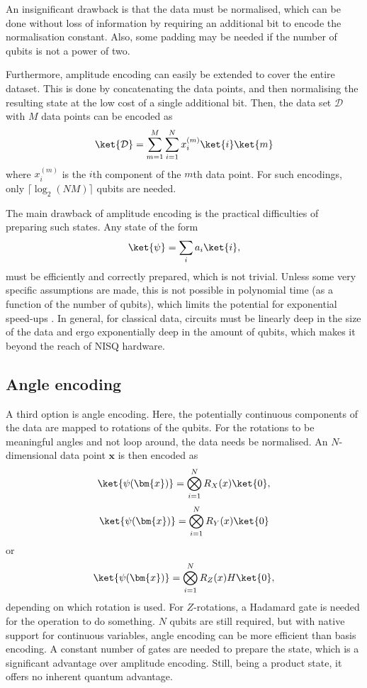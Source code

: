 An insignificant drawback is that the data must be normalised, which can be done without loss of information by requiring an additional bit to encode the normalisation constant.
Also, some padding may be needed if the number of qubits is not a power of two.

Furthermore, amplitude encoding can easily be extended to cover the entire dataset.
This is done by concatenating the data points, and then normalising the resulting state at the low cost of a single additional bit.
Then, the data set $\mathcal{D}$ with $M$ data points can be encoded as
\begin{equation}
    \ket{\mathcal{D}} = \sum_{m=1}^M \sum_{i=1}^{N} x_i^{(m)} \ket{i} \ket{m}
\end{equation}
where $x_i^{(m)}$ is the $i$th component of the $m$th data point.
For such encodings, only $\lceil \log_2 (N M) \rceil$ qubits are needed.

The main drawback of amplitude encoding is the practical difficulties of preparing such states.
Any state of the form
\begin{equation}
    \ket{\psi} = \sum_{i} a_i \ket{i},
\end{equation}
must be efficiently and correctly prepared, which is not trivial.
Unless some very specific assumptions are made, this is not possible in polynomial time (as a function of the number of qubits), which limits the potential for exponential speed-ups \cite{textbook}.
In general, for classical data, circuits must be linearly deep in the size of the data and ergo exponentially deep in the amount of qubits, which makes it beyond the reach of NISQ hardware.

\subsection{Angle encoding}
A third option is angle encoding.
Here, the potentially continuous components of the data are mapped to rotations of the qubits.
For the rotations to be meaningful angles and not loop around, the data needs be normalised.
An $N$-dimensional data point $\bm{x}$ is then encoded as
\begin{equation}
    \ket{\psi(\bm{x})} = \bigotimes_{i=1}^{N} R_X(x) \ket{0},
\end{equation}
\begin{equation}
    \ket{\psi(\bm{x})} = \bigotimes_{i=1}^{N} R_Y(x) \ket{0}
\end{equation}
or
\begin{equation}
    \ket{\psi(\bm{x})} = \bigotimes_{i=1}^{N} R_Z(x) H \ket{0},
\end{equation}
depending on which rotation is used.
For $Z$-rotations, a Hadamard gate is needed for the operation to do something.
$N$ qubits are still required, but with native support for continuous variables, angle encoding can be more efficient than basis encoding.
A constant number of gates are needed to prepare the state, which is a significant advantage over amplitude encoding.
Still, being a product state, it offers no inherent quantum advantage.


